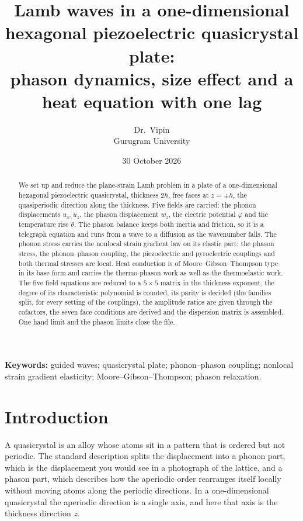 \documentclass[11pt]{article}
\title{\vspace{-1.2cm}Lamb waves in a one-dimensional hexagonal piezoelectric quasicrystal plate:\\
phason dynamics, size effect and a heat equation with one lag}
\author{Dr.\ Vipin \\ Gurugram University}
\date{30 October 2026}
\begin{document}
\maketitle

\begin{abstract}
\noindent
We set up and reduce the plane-strain Lamb problem in a plate of a one-dimensional hexagonal
piezoelectric quasicrystal, thickness $2h$, free faces at $z=\pm h$, the quasiperiodic direction along the
thickness. Five fields are carried: the phonon displacements $u_x,u_z$, the phason displacement $w_z$, the
electric potential $\varphi$ and the temperature rise $\theta$. The phason balance keeps both inertia and
friction, so it is a telegraph equation and runs from a wave to a diffusion as the wavenumber falls. The
phonon stress carries the nonlocal strain gradient law on its elastic part; the phason stress, the
phonon--phason coupling, the piezoelectric and pyroelectric couplings and both thermal stresses are local.
Heat conduction is of Moore--Gibson--Thompson type in its base form and carries the thermo-phason work as
well as the thermoelastic work. The five field equations are reduced to a $5\times5$ matrix in the
thickness exponent, the degree of its characteristic polynomial is counted, its parity is decided (the
families split, for every setting of the couplings), the amplitude ratios are given through the cofactors,
the seven face conditions are derived and the dispersion matrix is assembled. One hand limit and the
phason limits close the file.
\end{abstract}

\noindent\textbf{Keywords:} guided waves; quasicrystal plate; phonon--phason coupling; nonlocal strain
gradient elasticity; Moore--Gibson--Thompson; phason relaxation.

\section{Introduction}

A quasicrystal is an alloy whose atoms sit in a pattern that is ordered but not periodic. The standard
description splits the displacement into a phonon part, which is the displacement you would see in a
photograph of the lattice, and a phason part, which describes how the aperiodic order rearranges itself
locally without moving atoms along the periodic directions. In a one-dimensional quasicrystal the
aperiodic direction is a single axis, and here that axis is the thickness direction $z$.
\end{document}

